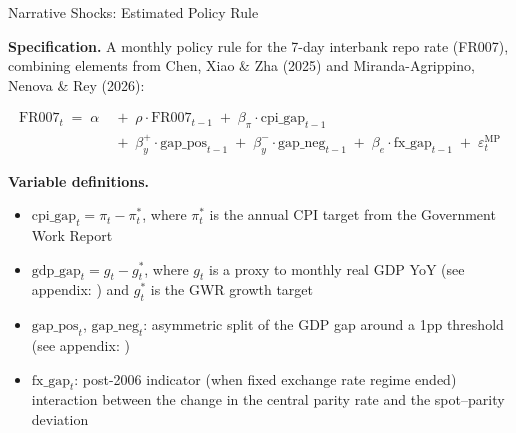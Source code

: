 \documentclass[10pt,aspectratio=169,t]{beamer}
\begin{document}
\begin{frame}{Narrative Shocks: Estimated Policy Rule}
\hypertarget{slide:rr}{}
 
\textbf{Specification.} A monthly policy rule for the 7-day interbank repo
rate (FR007), combining elements from Chen, Xiao
\& Zha (2025) and Miranda-Agrippino, Nenova \& Rey (2026):

{\small
\begin{align*}
\text{FR007}_t \;=\; \alpha
&\;+\; \rho \cdot \text{FR007}_{t-1}
\;+\; \beta_\pi \cdot \text{cpi\_gap}_{t-1} \\
&\;+\; \beta_y^{+} \cdot \text{gap\_pos}_{t-1}
\;+\; \beta_y^{-} \cdot \text{gap\_neg}_{t-1}
\;+\; \beta_e \cdot \text{fx\_gap}_{t-1}
\;+\; \varepsilon_t^{\text{MP}}
\end{align*}
}

\textbf{Variable definitions.}
\begin{itemize}\itemsep0.15em
  \item[$\bullet$] $\text{cpi\_gap}_t = \pi_t - \pi^{*}_t$, where $\pi^*_t$ is
        the annual CPI target from the Government Work Report
  \item[$\bullet$] $\text{gdp\_gap}_t = g_t - g^{*}_t$, where $g_t$ is a proxy to monthly real GDP YoY
        \textcolor{spgray}{\scriptsize(see appendix:
        \hyperlink{app:gdp}{})}
        and $g^*_t$ is the GWR growth target
  \item[$\bullet$] $\text{gap\_pos}_t$, $\text{gap\_neg}_t$: asymmetric split of the
        GDP gap around a 1pp threshold
        \textcolor{spgray}{\scriptsize(see appendix:
        \hyperlink{app:regime}{})}
  \item[$\bullet$] $\text{fx\_gap}_t$: post-2006 indicator (when fixed exchange rate regime   ended) interaction between the change in the central parity rate and the spot--parity deviation
\end{itemize}
\end{frame}
\end{document}
